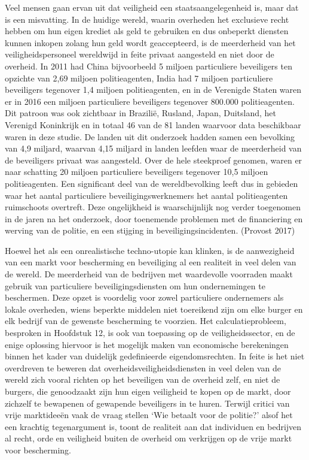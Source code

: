 \documentclass[
  a5paper,
  smalldemyvopaper,11pt,twoside,onecolumn,openright,extrafontsizes,
hidelinks]{memoir}
\begin{document}
Veel mensen gaan ervan uit dat veiligheid een staatsaangelegenheid is,
maar dat is een misvatting. In de huidige wereld, waarin overheden het
exclusieve recht hebben om hun eigen krediet als geld te gebruiken en
dus onbeperkt diensten kunnen inkopen zolang hun geld wordt
geaccepteerd, is de meerderheid van het veiligheidspersoneel wereldwijd
in feite privaat aangesteld en niet door de overheid. In 2011 had China
bijvoorbeeld 5 miljoen particuliere beveiligers ten opzichte van 2,69
miljoen politieagenten, India had 7 miljoen particuliere beveiligers
tegenover 1,4 miljoen politieagenten, en in de Verenigde Staten waren er
in 2016 een miljoen particuliere beveiligers tegenover 800.000
politieagenten. Dit patroon was ook zichtbaar in Brazilië, Rusland,
Japan, Duitsland, het Verenigd Koninkrijk en in totaal 46 van de 81
landen waarvoor data beschikbaar waren in deze studie. De landen uit dit
onderzoek hadden samen een bevolking van 4,9 miljard, waarvan 4,15
miljard in landen leefden waar de meerderheid van de beveiligers privaat
was aangesteld. Over de hele steekproef genomen, waren er naar schatting
20 miljoen particuliere beveiligers tegenover 10,5 miljoen
politieagenten. Een significant deel van de wereldbevolking leeft dus in
gebieden waar het aantal particuliere beveiligingswerknemers het aantal
politieagenten ruimschoots overtreft. Deze ongelijkheid is
waarschijnlijk nog verder toegenomen in de jaren na het onderzoek, door
toenemende problemen met de financiering en werving van de politie, en
een stijging in beveiligingsincidenten. (Provost 2017)

Hoewel het als een onrealistische techno-utopie kan klinken, is de
aanwezigheid van een markt voor bescherming en beveiliging al een
realiteit in veel delen van de wereld. De meerderheid van de bedrijven
met waardevolle voorraden maakt gebruik van particuliere
beveiligingsdiensten om hun ondernemingen te beschermen. Deze opzet is
voordelig voor zowel particuliere ondernemers als lokale overheden,
wiens beperkte middelen niet toereikend zijn om elke burger en elk
bedrijf van de gewenste bescherming te voorzien. Het calculatieprobleem,
besproken in Hoofdstuk 12, is ook van toepassing op de
veiligheidssector, en de enige oplossing hiervoor is het mogelijk maken
van economische berekeningen binnen het kader van duidelijk
gedefinieerde eigendomsrechten. In feite is het niet overdreven te
beweren dat overheidsveiligheidsdiensten in veel delen van de wereld
zich vooral richten op het beveiligen van de overheid zelf, en niet de
burgers, die genoodzaakt zijn hun eigen veiligheid te kopen op de markt,
door zichzelf te bewapenen of gewapende beveiligers in te huren. Terwijl
critici van vrije marktideeën vaak de vraag stellen `Wie betaalt voor de
politie?' alsof het een krachtig tegenargument is, toont de realiteit
aan dat individuen en bedrijven al recht, orde en veiligheid buiten de
overheid om verkrijgen op de vrije markt voor bescherming.
\end{document}

